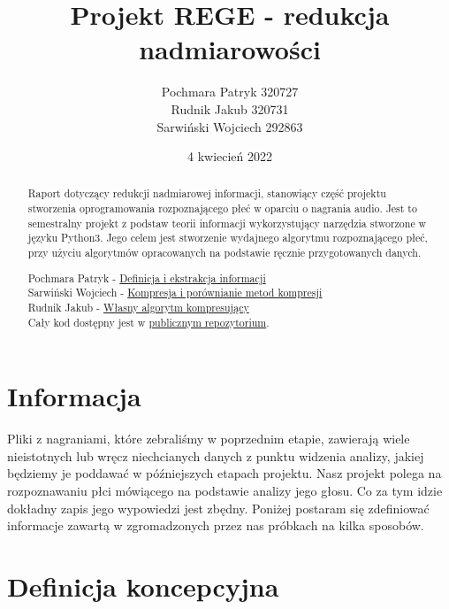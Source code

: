 \documentclass[a4paper,12pt]{extarticle}
\title{Projekt REGE - redukcja nadmiarowości}
\author{Pochmara Patryk 320727\\Rudnik Jakub 320731\\Sarwiński Wojciech 292863}
\date{4 kwiecień 2022}
\begin{document}
\maketitle

\begin{abstract}
Raport dotyczący redukcji nadmiarowej informacji, stanowiący część projektu stworzenia oprogramowania rozpoznającego płeć w oparciu o nagrania audio. Jest to semestralny projekt z podstaw teorii informacji wykorzystujący narzędzia stworzone w języku Python3. Jego celem jest stworzenie wydajnego algorytmu rozpoznającego płeć, przy użyciu algorytmów opracowanych na podstawie ręcznie przygotowanych danych.
\end{abstract}

\renewcommand{\abstractname}{Podział pracy}
\begin{abstract}
\noindent
Pochmara Patryk - \hyperref[sec:Informacja]{Definicja i ekstrakcja informacji}\\
Sarwiński Wojciech - \hyperref[sec:kompresja]{Kompresja i porównianie metod kompresji}\\
Rudnik Jakub - \hyperref[sec:wlasny]{Własny algorytm kompresujący}\\
Cały kod dostępny jest w \href{https://github.com/zeraye/rege}{publicznym repozytorium}.
\end{abstract}

\newpage

\tableofcontents

\newpage

\section{Informacja}
\label{sec:Informacja}

Pliki z nagraniami, które zebraliśmy w poprzednim etapie, zawierają wiele nieistotnych lub wręcz niechcianych danych z punktu widzenia analizy, jakiej będziemy je poddawać w późniejszych etapach projektu. Nasz projekt polega na rozpoznawaniu płci mówiącego na podstawie analizy jego głosu. Co za tym idzie dokładny zapis jego wypowiedzi jest zbędny. Poniżej postaram się zdefiniować informacje zawartą w zgromadzonych przez nas próbkach na kilka sposobów.

\section*{Definicja koncepcyjna}
\end{document}
